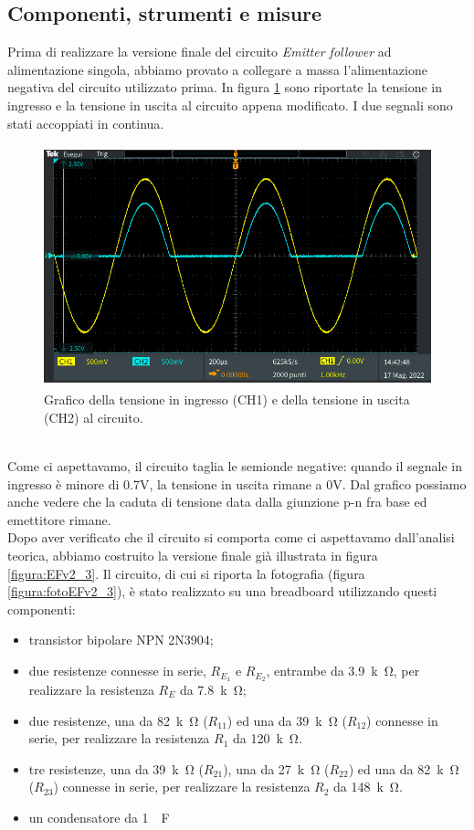 \documentclass{report}
\begin{document}
\subsection{Componenti, strumenti e misure} 
Prima di realizzare la versione finale del circuito \textit{Emitter follower} ad alimentazione singola, abbiamo provato a collegare a massa l'alimentazione negativa del circuito utilizzato prima. In figura \ref{figura:oscillo2} sono riportate la tensione in ingresso e la tensione in uscita al circuito appena modificato. I due segnali sono stati accoppiati in continua.
\begin{figure}[h]
\centering
\includegraphics[height=7cm]{immagini/oscillo2}
\caption{Grafico della tensione in ingresso (CH1) e della tensione in uscita (CH2) al circuito.}
\label{figura:oscillo2}
\end{figure}
\\\indent Come ci aspettavamo, il circuito taglia le semionde negative: quando il segnale in ingresso è minore di 0.7V, la tensione in uscita rimane a 0V. Dal grafico possiamo anche vedere che la caduta di tensione data dalla giunzione p-n fra base ed emettitore rimane.
\\\indent Dopo aver verificato che il circuito si comporta come ci aspettavamo dall'analisi teorica, abbiamo costruito la versione finale già illustrata in figura \ref{figura:EFv2_3}. Il circuito, di cui si riporta la fotografia (figura \ref{figura:fotoEFv2_3}), è stato realizzato su una breadboard utilizzando questi componenti:
\begin{itemize}
\item transistor bipolare NPN 2N3904;
\item due resistenze connesse in serie, $R_{E_1}$ e $R_{E_2}$, entrambe da \SI{3.9}{k\ohm}, per realizzare la resistenza $R_E$ da \SI{7.8}{k\ohm};
\item due resistenze, una da \SI{82}{k\ohm} ($R_{11}$) ed una da \SI{39}{k\ohm} ($R_{12}$) connesse in serie, per realizzare la resistenza $R_1$ da \SI{120}{k\ohm}.
\item tre resistenze, una da \SI{39}{k\ohm} ($R_{21}$), una da \SI{27}{k\ohm} ($R_{22}$) ed una da \SI{82}{k\ohm} ($R_{23}$) connesse in serie, per realizzare la resistenza $R_2$ da \SI{148}{k\ohm}.
\item un condensatore da \SI{1}{\mu\farad}
\end{itemize}
\end{document}
